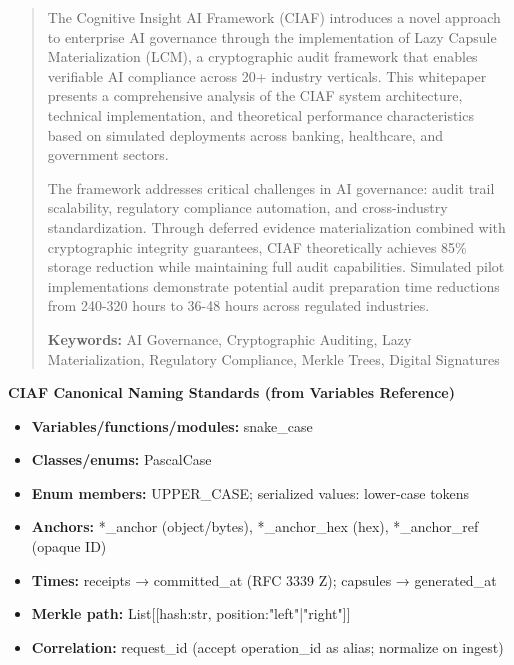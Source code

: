 \documentclass[12pt,a4paper]{article}
\begin{document}
\begin{abstract}
The Cognitive Insight AI Framework (CIAF) introduces a novel approach to enterprise AI governance through the implementation of Lazy Capsule Materialization (LCM\texttrademark), a cryptographic audit framework that enables verifiable AI compliance across 20+ industry verticals. This whitepaper presents a comprehensive analysis of the CIAF system architecture, technical implementation, and theoretical performance characteristics based on simulated deployments across banking, healthcare, and government sectors.

The framework addresses critical challenges in AI governance: audit trail scalability, regulatory compliance automation, and cross-industry standardization. Through deferred evidence materialization combined with cryptographic integrity guarantees, CIAF theoretically achieves 85\% storage reduction while maintaining full audit capabilities. Simulated pilot implementations demonstrate potential audit preparation time reductions from 240-320 hours to 36-48 hours across regulated industries.

\textbf{Keywords:} AI Governance, Cryptographic Auditing, Lazy Materialization, Regulatory Compliance, Merkle Trees, Digital Signatures
\end{abstract}



\begin{technicalbox}
\textbf{CIAF Canonical Naming Standards (from Variables Reference)}
\begin{itemize}
\item \textbf{Variables/functions/modules:} snake\_case
\item \textbf{Classes/enums:} PascalCase  
\item \textbf{Enum members:} UPPER\_CASE; serialized values: lower-case tokens
\item \textbf{Anchors:} *\_anchor (object/bytes), *\_anchor\_hex (hex), *\_anchor\_ref (opaque ID)
\item \textbf{Times:} receipts → committed\_at (RFC 3339 Z); capsules → generated\_at
\item \textbf{Merkle path:} List[[hash:str, position:"left"|"right"]]
\item \textbf{Correlation:} request\_id (accept operation\_id as alias; normalize on ingest)
\end{itemize}
\end{technicalbox}
\end{document}
